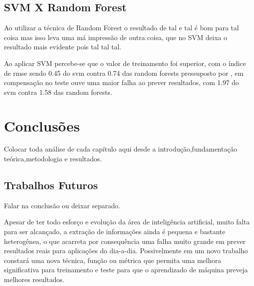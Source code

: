 \documentclass[tcc, capa]{texucpel}
\begin{document}
\section{SVM X Random Forest}

Ao utilizar a técnica de Random Forest o resultado de tal e tal é bom para tal coisa mas isso leva uma má impressão de outra coisa, que no SVM deixa o resultado mais evidente pois tal tal tal.

Ao aplicar SVM percebe-se que o valor de treinamento foi superior, com o índice de rmse sendo 0.45 do svm contra 0.74 das random forests pressuposto por \cite{ballester2010machine}, em compensação no teste ouve uma maior falha ao prever resultados, com 1.97 do svm contra 1.58 das random forests.

\chapter{Conclusões}

Colocar toda análise de cada capítulo aqui desde a introdução,fundamentação teórica,metodologia e resultados.

\section{Trabalhos Futuros}

Falar na conclusão ou deixar separado.

Apesar de ter todo esforço e evolução da área de inteligência artificial, muito falta para ser alcançado, a extração de informações ainda é pequena e bastante heterogênea, o que acarreta por consequência uma falha muito grande em prever resultados reais para aplicações do dia-a-dia.
Possivelmente em um novo trabalho constará uma nova técnica, função ou métrica que permita uma melhora significativa para treinamento e teste para que o aprendizado de máquina preveja melhores resultados.




\end{document}
